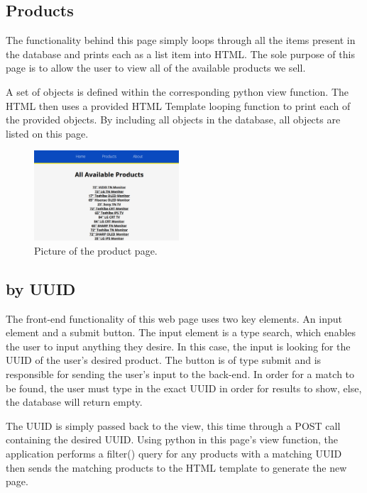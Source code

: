 \documentclass[sigconf]{acmart}
\begin{document}
\subsection{Products}\label{products}
The functionality behind this page simply loops through all the items present in the database and prints each as a list item into HTML. The sole purpose of this page is to allow the user to view all of the available products we sell. \par
A set of objects is defined within the corresponding python view function. The HTML then uses a provided HTML Template looping function to print each of the provided objects. By including all objects in the database, all objects are listed on this page.

\begin{figure}[H] %
	\centering %
	\includegraphics[width=0.48\textwidth]{Figures/allproducts.png} %
	\caption{Picture of the product page.}
\end{figure}

\subsection{by UUID}\label{uuid}
The front-end functionality of this web page uses two key elements. An input element and a submit button. The input element is a type search, which enables the user to input anything they desire. In this case, the input is looking for the UUID of the user's desired product. The button is of type submit and is responsible for sending the user's input to the back-end. In order for a match to be found, the user must type in the exact UUID in order for results to show, else, the database will return empty. \par
The UUID is simply passed back to the view, this time through a POST call containing the desired UUID. Using python in this page's view function, the application performs a filter() query for any products with a matching UUID then sends the matching products to the HTML template to generate the new page.
\end{document}
